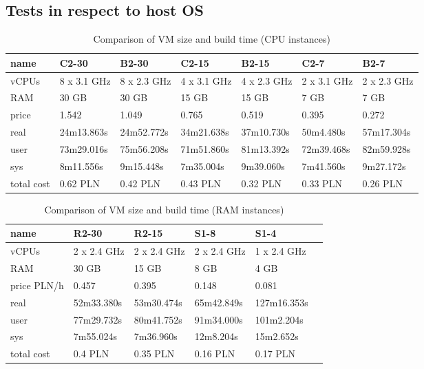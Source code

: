 \documentclass[printmode]{mgr}
\begin{document}
\begin{landscape}


\section{Tests in respect to host OS}



\begin{table}
  \begin{tabular}{| p{2.5cm} | p{3cm} | p{3cm} | p{3cm} | p{3cm} | p{3cm} | p{3cm} |}
    \hline
    name & C2-30 & B2-30 & C2-15 & B2-15 & C2-7 & B2-7 \\
    \hline
    vCPUs & 8 x 3.1 GHz & 8 x 2.3 GHz & 4 x 3.1 GHz & 4 x 2.3 GHz & 2 x 3.1 GHz & 2 x 2.3 GHz \\
    \hline
    RAM & 30 GB & 30 GB & 15 GB & 15 GB & 7 GB & 7 GB \\
    \hline
    price & 1.542 & 1.049 & 0.765 & 0.519 & 0.395 & 0.272 \\
    \hline
    real & 24m13.863s & 24m52.772s & 34m21.638s & 37m10.730s & 50m4.480s & 57m17.304s \\
    \hline
    user & 73m29.016s & 75m56.208s & 71m51.860s & 81m13.392s & 72m39.468s & 82m59.928s \\
    \hline
    sys & 8m11.556s & 9m15.448s & 7m35.004s & 9m39.060s & 7m41.560s & 9m27.172s \\
    \hline
    total cost & 0.62 PLN & 0.42 PLN & 0.43 PLN & 0.32 PLN & 0.33 PLN & 0.26 PLN \\
    \hline
  \end{tabular}
  \caption{Comparison of VM size and build time (CPU instances)}
\end{table}



\begin{table}
  \begin{tabular}{| p{2.5cm} | p{3cm} | p{3cm} | p{3cm} | p{3cm} | p{3cm} |}
    \hline
    name & R2-30 & R2-15 & S1-8 & S1-4 \\
    \hline
    vCPUs & 2 x 2.4 GHz & 2 x 2.4 GHz & 2 x 2.4 GHz & 1 x 2.4 GHz \\
    \hline
    RAM & 30 GB & 15 GB & 8 GB & 4 GB \\
    \hline
    price PLN/h& 0.457 & 0.395 & 0.148 & 0.081 \\
    \hline
    real & 52m33.380s & 53m30.474s & 65m42.849s & 127m16.353s \\
    \hline
    user & 77m29.732s & 80m41.752s & 91m34.000s & 101m2.204s \\
    \hline
    sys & 7m55.024s & 7m36.960s & 12m8.204s & 15m2.652s \\
    \hline
    total cost & 0.4 PLN & 0.35 PLN & 0.16 PLN & 0.17 PLN \\
    \hline
  \end{tabular}
  \caption{Comparison of VM size and build time (RAM instances)}
\end{table}

\end{landscape}
\end{document}
